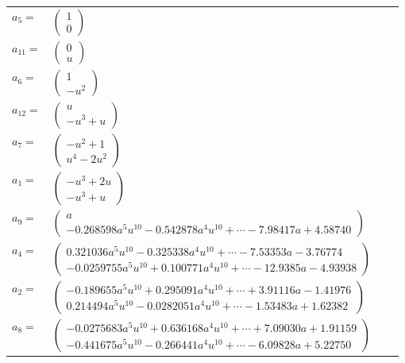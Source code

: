 \documentclass[1p]{elsarticle_modified}
\theoremstyle{definition}
\begin{document}
\begin{tabular}{m{7pt} m{180pt} m{7pt} m{180pt} }
\flushright $a_{5}=$&$\begin{pmatrix}1\\0\end{pmatrix}$ \\
\flushright $a_{11}=$&$\begin{pmatrix}0\\u\end{pmatrix}$ \\
\flushright $a_{6}=$&$\begin{pmatrix}1\\- u^2\end{pmatrix}$ \\
\flushright $a_{12}=$&$\begin{pmatrix}u\\- u^3+u\end{pmatrix}$ \\
\flushright $a_{7}=$&$\begin{pmatrix}- u^2+1\\u^4-2 u^2\end{pmatrix}$ \\
\flushright $a_{1}=$&$\begin{pmatrix}- u^3+2 u\\- u^3+u\end{pmatrix}$ \\
\flushright $a_{9}=$&$\begin{pmatrix}a\\-0.268598 a^{5} u^{10}-0.542878 a^{4} u^{10}+\cdots-7.98417 a+4.58740\end{pmatrix}$ \\
\flushright $a_{4}=$&$\begin{pmatrix}0.321036 a^{5} u^{10}-0.325338 a^{4} u^{10}+\cdots-7.53353 a-3.76774\\-0.0259755 a^{5} u^{10}+0.100771 a^{4} u^{10}+\cdots-12.9385 a-4.93938\end{pmatrix}$ \\
\flushright $a_{2}=$&$\begin{pmatrix}-0.189655 a^{5} u^{10}+0.295091 a^{4} u^{10}+\cdots+3.91116 a-1.41976\\0.214494 a^{5} u^{10}-0.0282051 a^{4} u^{10}+\cdots-1.53483 a+1.62382\end{pmatrix}$ \\
\flushright $a_{8}=$&$\begin{pmatrix}-0.0275683 a^{5} u^{10}+0.636168 a^{4} u^{10}+\cdots+7.09030 a+1.91159\\-0.441675 a^{5} u^{10}-0.266441 a^{4} u^{10}+\cdots-6.09828 a+5.22750\end{pmatrix}$ \\

\end{tabular}
\end{document}
